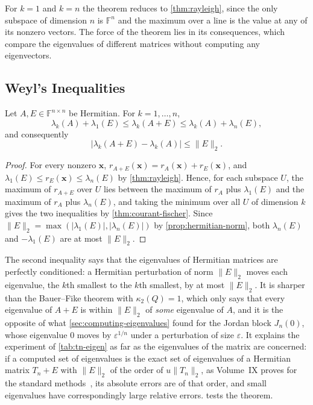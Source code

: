 For $k=1$ and $k=n$ the theorem reduces to \cref{thm:rayleigh}, since the only subspace of dimension $n$ is $\mathbb F^n$ and the maximum over a line is the value at any of its nonzero vectors. The force of the theorem lies in its consequences, which compare the eigenvalues of different matrices without computing any eigenvectors.

\subsection{Weyl's Inequalities}

\begin{theorem}
\label{thm:weyl}
Let $A,E\in\mathbb F^{n\times n}$ be Hermitian. For $k=1,\ldots,n$,
\[
\lambda_k(A)+\lambda_1(E)\le\lambda_k(A+E)\le\lambda_k(A)+\lambda_n(E),
\]
and consequently
\[
|\lambda_k(A+E)-\lambda_k(A)|\le\|E\|_2 .
\]
\end{theorem}

\begin{proof}
For every nonzero $\mathbf x$, $r_{A+E}(\mathbf x)=r_A(\mathbf x)+r_E(\mathbf x)$, and $\lambda_1(E)\le r_E(\mathbf x)\le\lambda_n(E)$ by \cref{thm:rayleigh}. Hence, for each subspace $U$, the maximum of $r_{A+E}$ over $U$ lies between the maximum of $r_A$ plus $\lambda_1(E)$ and the maximum of $r_A$ plus $\lambda_n(E)$, and taking the minimum over all $U$ of dimension $k$ gives the two inequalities by \cref{thm:courant-fischer}. Since $\|E\|_2=\max(|\lambda_1(E)|,|\lambda_n(E)|)$ by \cref{prop:hermitian-norm}, both $\lambda_n(E)$ and $-\lambda_1(E)$ are at most $\|E\|_2$.
\end{proof}

The second inequality says that the eigenvalues of Hermitian matrices are perfectly conditioned: a Hermitian perturbation of norm $\|E\|_2$ moves each eigenvalue, the $k$th smallest to the $k$th smallest, by at most $\|E\|_2$. It is sharper than the Bauer--Fike theorem with $\kappa_2(Q)=1$, which only says that every eigenvalue of $A+E$ is within $\|E\|_2$ of \emph{some} eigenvalue of $A$, and it is the opposite of what \cref{sec:computing-eigenvalues} found for the Jordan block $J_n(0)$, whose eigenvalue $0$ moves by $\varepsilon^{1/n}$ under a perturbation of size $\varepsilon$. It explains the experiment of \cref{tab:tn-eigen} as far as the eigenvalues of the matrix are concerned: if a computed set of eigenvalues is the exact set of eigenvalues of a Hermitian matrix $T_n+E$ with $\|E\|_2$ of the order of $u\|T_n\|_2$, as Volume~IX proves for the standard methods~\cite[Sect.~8.3]{golub2013}, its absolute errors are of that order, and small eigenvalues have correspondingly large relative errors.  tests the theorem.

